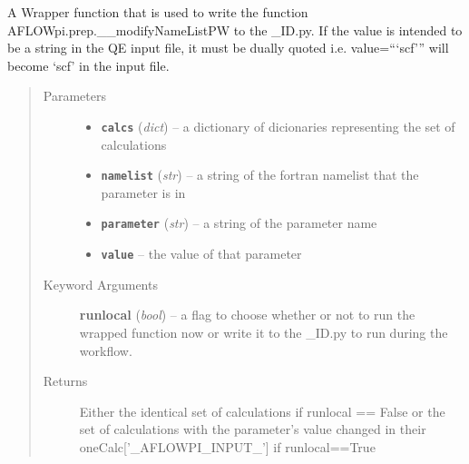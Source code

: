 \documentclass[letterpaper,10pt,english]{sphinxmanual}
\begin{document}
\begin{fulllineitems}
\label{prep:prep.modifyNamelistPW}
A Wrapper function that is used to write the function AFLOWpi.prep.\_\_modifyNameListPW
to the \_ID.py. If the value is intended to be a string in the QE input file, it must
be dually quoted i.e. value=```scf''' will become `scf' in the input file.
\begin{quote}\begin{description}
\item[{Parameters}] \leavevmode\begin{itemize}
\item {} 
\textbf{\texttt{calcs}} (\emph{dict}) -- a dictionary of dicionaries representing the set of calculations

\item {} 
\textbf{\texttt{namelist}} (\emph{str}) -- a string of the fortran namelist that the parameter is in

\item {} 
\textbf{\texttt{parameter}} (\emph{str}) -- a string of the parameter name

\item {} 
\textbf{\texttt{value}} -- the value of that parameter

\end{itemize}

\item[{Keyword Arguments}] \leavevmode
\textbf{runlocal} (\emph{bool}) --
a flag to choose whether or not to run the wrapped function now
or write it to the \_ID.py to run during the workflow.

\item[{Returns}] \leavevmode
Either the identical set of calculations if runlocal == False or the set of
calculations with the parameter's value changed in their oneCalc{[}'\_AFLOWPI\_INPUT\_'{]}
if runlocal==True

\end{description}\end{quote}

\end{fulllineitems}

\end{document}

